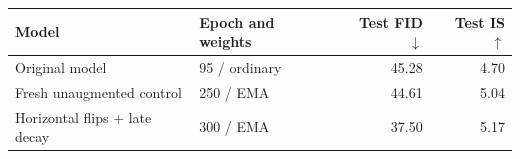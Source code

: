 \begin{tabular}{llrr}
\toprule
Model & Epoch and weights & Test FID $\downarrow$ & Test IS $\uparrow$ \\
\midrule
Original model & 95 / ordinary & 45.28 & 4.70 \\
Fresh unaugmented control & 250 / EMA & 44.61 & 5.04 \\
Horizontal flips + late decay & 300 / EMA & 37.50 & 5.17 \\
\bottomrule
\end{tabular}
